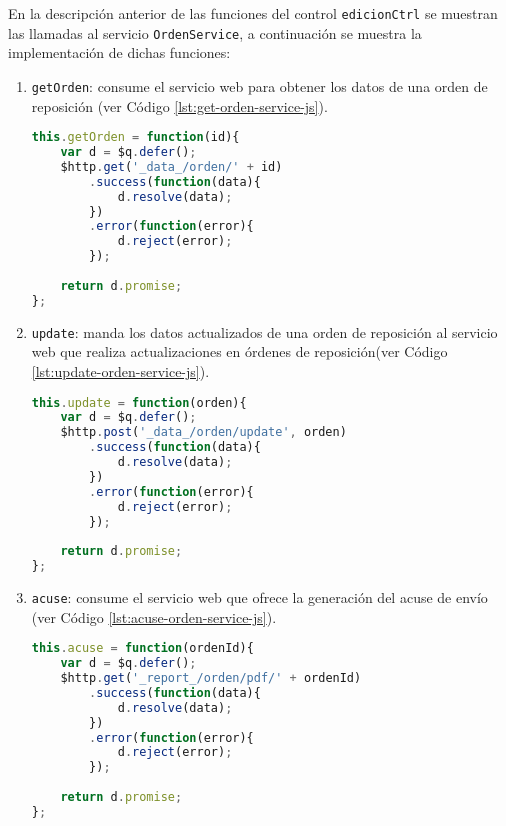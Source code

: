 En la descripción anterior de las funciones del control \texttt{edicionCtrl} se muestran las llamadas al servicio \texttt{OrdenService}, a continuación se muestra la implementación de dichas funciones:

\begin{enumerate}
	\item \texttt{getOrden}: consume el servicio web para obtener los datos de una orden de reposición (ver Código \ref{lst:get-orden-service-js}).
\begin{lstlisting}[language=Javascript, caption={Función para consumir el servicio web que obtiene los datos de una orden de reposición.}, captionpos=b, label={lst:get-orden-service-js}]
this.getOrden = function(id){
	var d = $q.defer();
	$http.get('_data_/orden/' + id)
		.success(function(data){
			d.resolve(data);
		})
		.error(function(error){
			d.reject(error);
		});
	
	return d.promise;
};
\end{lstlisting}

	\item \texttt{update}: manda los datos actualizados de una orden de reposición al servicio web que realiza actualizaciones en órdenes de reposición(ver Código \ref{lst:update-orden-service-js}).
\begin{lstlisting}[language=Javascript, caption={Función para actualizar los datos de una orden de reposición}, captionpos=b, label={lst:update-orden-service-js}]
this.update = function(orden){
	var d = $q.defer();
	$http.post('_data_/orden/update', orden)
		.success(function(data){
			d.resolve(data);
		})
		.error(function(error){
			d.reject(error);
		});
	
	return d.promise;
};
\end{lstlisting}

	\item \texttt{acuse}: consume el servicio web que ofrece la generación del acuse de envío (ver Código \ref{lst:acuse-orden-service-js}).
\begin{lstlisting}[language=Javascript, caption={Función para mandar la generación del acuse de envío de una orden de reposición.}, captionpos=b, label={lst:acuse-orden-service-js}]
this.acuse = function(ordenId){
	var d = $q.defer();
	$http.get('_report_/orden/pdf/' + ordenId)
		.success(function(data){
			d.resolve(data);
		})
		.error(function(error){
			d.reject(error);
		});
	
	return d.promise;
};
\end{lstlisting}

\end{enumerate}

